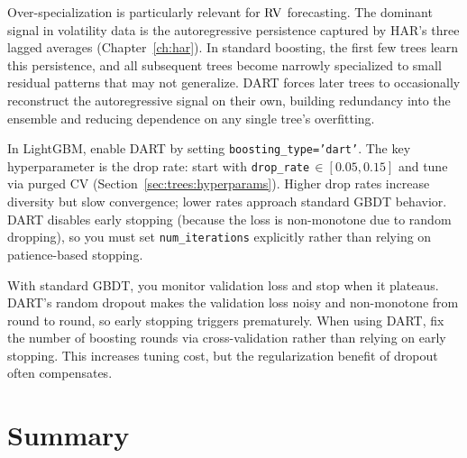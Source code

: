 \begin{projectconnection}
Over-specialization is particularly relevant for $\operatorname{RV}$ forecasting.  The
dominant signal in volatility data is the autoregressive persistence captured
by HAR's three lagged averages (Chapter~\ref{ch:har}).  In standard
boosting, the first few trees learn this persistence, and all subsequent
trees become narrowly specialized to small residual patterns that may not
generalize.  DART forces later trees to occasionally reconstruct the
autoregressive signal on their own, building redundancy into the ensemble
and reducing dependence on any single tree's overfitting.

In LightGBM, enable DART by setting \texttt{boosting\_type='dart'}.  The key
hyperparameter is the drop rate: start with
\texttt{drop\_rate}$\,\in [0.05, 0.15]$ and tune via purged CV
(Section~\ref{sec:trees:hyperparams}).  Higher drop rates increase diversity
but slow convergence; lower rates approach standard GBDT behavior.  DART
disables early stopping (because the loss is non-monotone due to random
dropping), so you must set \texttt{num\_iterations} explicitly rather than
relying on patience-based stopping.
\end{projectconnection}

\begin{warning}
With standard GBDT, you monitor validation loss and stop when it plateaus.
DART's random dropout makes the validation loss noisy and non-monotone from
round to round, so early stopping triggers prematurely.  When using DART,
fix the number of boosting rounds via cross-validation rather than relying
on early stopping.  This increases tuning cost, but the regularization
benefit of dropout often compensates.
\end{warning}


\section{Summary}\label{sec:trees:summary}


